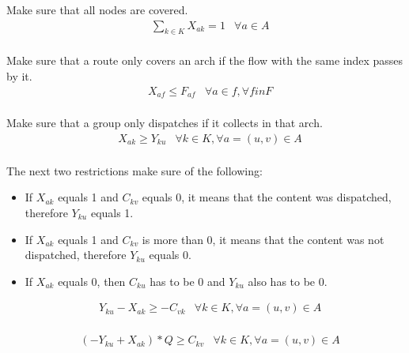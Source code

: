 Make sure that all nodes are covered. \\

\begin{align*}
&\sum_{k \in K}{X_{ak}=1} & \forall a \in A\\
\end{align*}

Make sure that a route only covers an arch if the flow with the same index passes by it. \\

\begin{align*}
        &X_{af} \leq F_{af} & \forall a \in f, \forall f in F \\
\end{align*}

Make sure that a group only dispatches if it collects in that arch. \\

\begin{align*}
        &X_{ak} \geq Y_{ku} & \forall k \in K, \forall a = (u,v) \in A \\
\end{align*}

The next two restrictions make sure of the following: \\

\begin{itemize}
    \item If $X_{ak}$ equals 1 and $C_{kv}$ equals 0, it means that the content was dispatched, therefore $Y_{ku}$ equals 1. \\
    \item If $X_{ak}$ equals 1 and $C_{kv}$ is more than 0, it means that the content was not dispatched, therefore $Y_{ku}$ equals 0. \\ 
    \item If $X_{ak}$ equals 0, then $C_{ku}$ has to be 0 and $Y_{ku}$ also has to be 0. \\
\end{itemize}

\begin{align*}
        &Y_{ku} - X_{ak} \geq -C_{vk} & \forall k \in K, \forall a = (u,v) \in A \\
\end{align*}

\begin{align*}
        &(-Y_{ku} + X_{ak}) * Q \geq C_{kv} & \forall k \in K, \forall a = (u,v) \in A \\
\end{align*}
